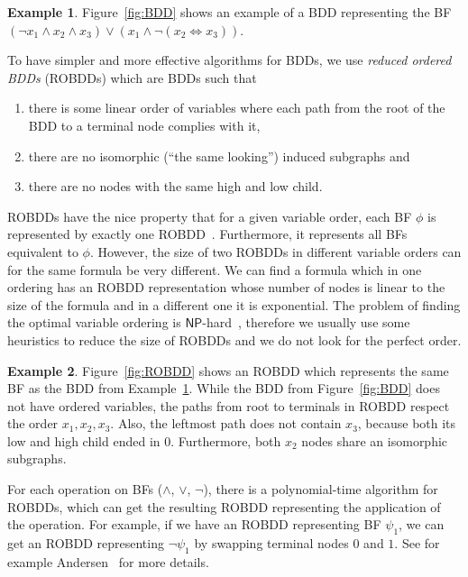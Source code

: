 \documentclass[
  digital, %
  color,
  twoside, %
  table,   %
  nolof,     %
  nolot,     %
]{fithesis3}
\theoremstyle{definition}
\newtheorem{example}{Example}
\theoremstyle{remark}
\newcommand{\lequal}{\Leftrightarrow}
\newcommand{\ComplexityFont}[1]{\mathsf{#1}}
\newcommand{\NP}{\ComplexityFont{NP}}
\begin{document}
\begin{example}
\label{ex:BDD}
Figure~\ref{fig:BDD} shows an example of a BDD representing the BF $(\neg x_1 \land x_2 \land x_3) \lor (x_1 \land \neg (x_2 \lequal x_3))$. 
\end{example}

To have simpler and more effective algorithms for BDDs, we use \emph{reduced ordered BDDs} (ROBDDs) which are BDDs such that 
\begin{enumerate}
    \item there is some linear order of variables where each path from the root of the BDD to a terminal node complies with it,
    \item there are no isomorphic (``the same looking'') induced subgraphs and
    \item there are no nodes with the same high and low child.
\end{enumerate}
ROBDDs have the nice property that for a given variable order, each BF $\phi$ is represented by exactly one ROBDD~\cite{BDD}. Furthermore, it represents all BFs equivalent to $\phi$. However, the size of two ROBDDs in different variable orders can for the same formula be very different. We can find a formula which in one ordering has an ROBDD representation whose number of nodes is linear to the size of the formula and in a different one it is exponential. The problem of finding the optimal variable ordering is $\NP$-hard~\cite{BDDoptimalorderisNP}, therefore we usually use some heuristics to reduce the size of ROBDDs and we do not look for the perfect order.

\begin{example}
\label{ex:ROBDD}
Figure~\ref{fig:ROBDD} shows an ROBDD which represents the same BF as the BDD from Example~\ref{ex:BDD}. While the BDD from Figure~\ref{fig:BDD} does not have ordered variables, the paths from root to terminals in ROBDD respect the order $x_1,x_2,x_3$. Also, the leftmost path does not contain $x_3$, because both its low and high child ended in $0$. Furthermore, both $x_2$ nodes share an isomorphic subgraphs.
\end{example}

For each operation on BFs (${\land}$, ${\lor}$, ${\neg}$), there is a polynomial-time algorithm for ROBDDs, which can get the resulting ROBDD representing the application of the operation. For example, if we have an ROBDD representing BF $\psi_1$, we can get an ROBDD representing $\neg \psi_1$ by swapping terminal nodes $0$ and $1$. See for example Andersen~\cite{BDDdetails} for more details.
\end{document}
